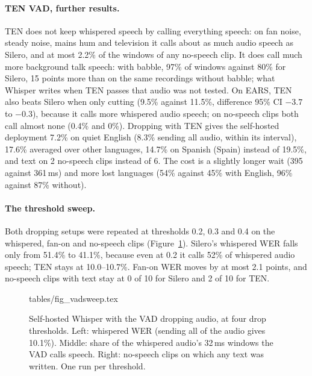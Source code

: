 \documentclass[11pt]{article}
\begin{document}
\paragraph{TEN VAD, further results.} TEN does not keep whispered speech by calling everything speech: on fan noise, steady noise, mains hum and television it calls about as much audio speech as Silero, and at most 2.2\% of the windows of any no-speech clip. It does call much more background talk speech: with babble, 97\% of windows against 80\% for Silero, 15 points more than on the same recordings without babble; what Whisper writes when TEN passes that audio was not tested. On EARS, TEN also beats Silero when only cutting (9.5\% against 11.5\%, difference 95\% CI $-3.7$ to $-0.3$), because it calls more whispered audio speech; on no-speech clips both call almost none (0.4\% and 0\%). Dropping with TEN gives the self-hosted deployment 7.2\% on quiet English (8.3\% sending all audio, within its interval), 17.6\% averaged over other languages, 14.7\% on Spanish (Spain) instead of 19.5\%, and text on 2 no-speech clips instead of 6. The cost is a slightly longer wait (395 against 361\,ms) and more lost languages (54\% against 45\% with English, 96\% against 87\% without).

\paragraph{The threshold sweep.} Both dropping setups were repeated at thresholds 0.2, 0.3 and 0.4 on the whispered, fan-on and no-speech clips (Figure~\ref{fig:vadsweep}). Silero's whispered WER falls only from 51.4\% to 41.1\%, because even at 0.2 it calls 52\% of whispered audio speech; TEN stays at 10.0--10.7\%. Fan-on WER moves by at most 2.1 points, and no-speech clips with text stay at 0 of 10 for Silero and 2 of 10 for TEN.

\begin{figure}[!htbp]
\centering
\tabinput tables/fig_vadsweep.tex
\caption{Self-hosted Whisper with the VAD dropping audio, at four drop thresholds. Left: whispered WER (sending all of the audio gives 10.1\%). Middle: share of the whispered audio's 32\,ms windows the VAD calls speech. Right: no-speech clips on which any text was written. One run per threshold.}
\label{fig:vadsweep}
\end{figure}
\end{document}
